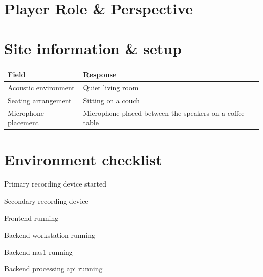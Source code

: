 
\section{Player Role \& Perspective}

\section{Site information \& setup}
\begin{table}[h]
\centering
\begin{tabular}{|p{5cm}|p{10cm}|}
\hline
\textbf{Field} & \textbf{Response} \\ \hline
Acoustic environment & Quiet living room \\[1.5cm] \hline
Seating arrangement & Sitting on a couch \\[1.5cm] \hline
Microphone placement & Microphone placed between the speakers on a coffee table\\[1.5cm] \hline
\end{tabular}
\end{table}

\section{Environment checklist}
    \begin{todolist}
    \item[\done] Primary recording device started
    \item[\done] Secondary recording device
    \item[\done] Frontend running
    \item[\done] Backend workstation running
    \item[\done] Backend nas1 running
    \item[\done] Backend processing api running
    \end{todolist}

